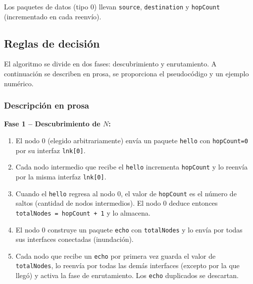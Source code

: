 \documentclass[10pt,letterpaper,twocolumn]{article}
\begin{document}
Los paquetes de datos (tipo 0) llevan \texttt{source}, \texttt{destination} y
\texttt{hopCount} (incrementado en cada reenvío).

\subsection{Reglas de decisión}

El algoritmo se divide en dos fases: descubrimiento y enrutamiento. A continuación
se describen en prosa, se proporciona el pseudocódigo y un ejemplo numérico.

\subsubsection*{Descripción en prosa}

\textbf{Fase 1 – Descubrimiento de \(N\):}
\begin{enumerate}
    \item El nodo 0 (elegido arbitrariamente) envía un paquete \texttt{hello} con
        \texttt{hopCount=0} por su interfaz \texttt{lnk[0]}.
    \item Cada nodo intermedio que recibe el \texttt{hello} incrementa
        \texttt{hopCount} y lo reenvía por la misma interfaz \texttt{lnk[0]}.
    \item Cuando el \texttt{hello} regresa al nodo 0, el valor de
        \texttt{hopCount} es el número de saltos (cantidad de nodos intermedios).
        El nodo 0 deduce entonces \texttt{totalNodes = hopCount + 1} y lo almacena.
    \item El nodo 0 construye un paquete \texttt{echo} con \texttt{totalNodes} y lo
        envía por todas sus interfaces conectadas (inundación).
    \item Cada nodo que recibe un \texttt{echo} por primera vez guarda el valor de
        \texttt{totalNodes}, lo reenvía por todas las demás interfaces (excepto por
        la que llegó) y activa la fase de enrutamiento. Los \texttt{echo} duplicados
        se descartan.
\end{enumerate}
\end{document}
